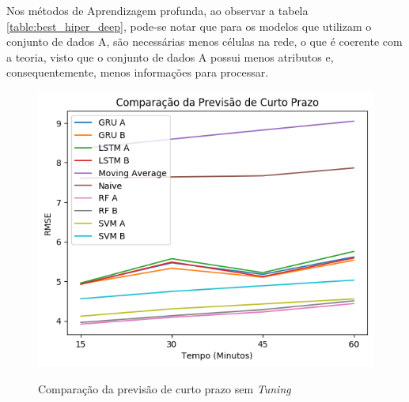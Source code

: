 Nos métodos de Aprendizagem profunda, ao observar a tabela \ref{table:best_hiper_deep}, pode-se notar que para os modelos que utilizam o conjunto de dados A, são necessárias menos células na rede, o que é coerente com a teoria, visto que o conjunto de dados A possui menos atributos e, consequentemente, menos informações para processar.

\begin{figure}[H]
    \centering
    \includegraphics[scale=0.8]{monography/img/comparisons/comparacao_da_previsao_de_curto_prazo_rmse.png}
    \label{figure:pred_no_tuning}
    \caption{Comparação da previsão de curto prazo sem \textit{Tuning}}
\end{figure}

